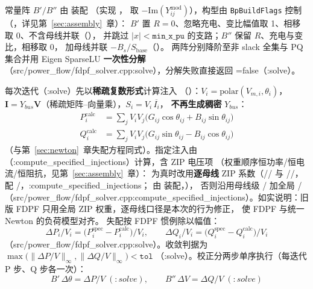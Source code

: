 常量阵 $B'/B''$ 由  装配
（实现 ，
取 $-\mathrm{Im}(Y^{\mathrm{mod}}_{ij})$），构型由 \texttt{BpBuildFlags} 控制
（，详见第~\ref{sec:assembly}~章）：
$B'$ 置 $R=0$、忽略充电、变比幅值取 1、相移取 0、不含母线并联（），
并跳过 $|x|<\texttt{min\_x\_pu}$ 的支路；$B''$ 保留 $R$、充电与变比，相移取 0，
加母线并联 $-B_s/S_{\mathrm{base}}$（）。
两阵分别降阶至非 slack 全集与 PQ 集合并用 Eigen SparseLU \textbf{一次性分解}
（src/power\_flow/fdpf\_solver.cpp:solve），分解失败直接返回 =false（:solve）。

每次迭代（:solve）先以\textbf{稀疏复数形式}计算注入
（）：$V_i=\mathrm{polar}(V_{m,i},\theta_i)$，
$\mathbf I=Y_{bus}\mathbf V$（稀疏矩阵--向量乘），$S_i=V_i\,\overline{I_i}$，
\textbf{不再生成稠密} $Y_{bus}$：
\begin{align*}
P_i^{\mathrm{calc}}&=\sum_{j}V_iV_j\big(G_{ij}\cos\theta_{ij}+B_{ij}\sin\theta_{ij}\big)\\
Q_i^{\mathrm{calc}}&=\sum_{j}V_iV_j\big(G_{ij}\sin\theta_{ij}-B_{ij}\cos\theta_{ij}\big)
\end{align*}
（与第~\ref{sec:newton}~章失配方程同式）。指定注入由
（:compute\_specified\_injections）计算，含 ZIP 电压项
（权重顺序恒功率/恒电流/恒阻抗，见第~\ref{sec:assembly}~章）：
为真时改用\textbf{逐母线} ZIP 系数（// 与
//，配 /，:compute\_specified\_injections；
由  装配，），
否则沿用母线级 / 加全局 /
（src/power\_flow/fdpf\_solver.cpp:compute\_specified\_injections）。如实说明：旧版 FDPF 只用全局 ZIP 权重，逐母线口径是本次的行为修正，
使 FDPF 与统一 Newton 的负荷模型对齐。
失配按 FDPF 惯例除以幅值：
\[
\Delta P_i/V_i=\big(P_i^{\mathrm{spec}}-P_i^{\mathrm{calc}}\big)/V_i,\qquad
\Delta Q_i/V_i=\big(Q_i^{\mathrm{spec}}-Q_i^{\mathrm{calc}}\big)/V_i
\]
（src/power\_flow/fdpf\_solver.cpp:solve）。收敛判据为
$\max\big(\lVert\Delta P/V\rVert_\infty,\lVert\Delta Q/V\rVert_\infty\big)<\texttt{tol}$
（:solve）。校正分两步单序执行（每迭代 P 步、Q 步各一次）：
\[
B'\,\Delta\theta=\Delta P/V\;(:solve),\qquad
B''\,\Delta V=\Delta Q/V\;(:solve)
\]
